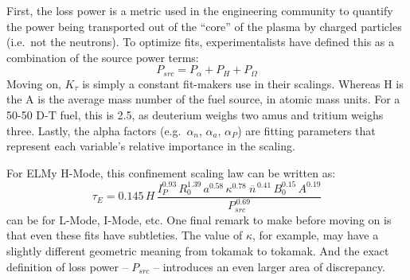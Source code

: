 First, the loss power is a metric used in the engineering community to quantify the power being transported out of the ``core'' of the plasma by charged particles (i.e.\ not the neutrons). \cite{process} To optimize fits, experimentalists have defined this as a combination of the source power terms:
\begin{equation}
	\label{eq:pl}
	P_{src} = P_\alpha + P_H + P_\Omega
\end{equation}
Moving on, $K_\tau$ is simply a constant fit-makers use in their scalings. Whereas H is the   A is the average mass number of the fuel source, in atomic mass units. For a 50-50 D-T fuel, this is 2.5, as deuterium weighs two amus and tritium weighs three. Lastly, the alpha factors (e.g.\ $\alpha_n$, $\alpha_a$, $\alpha_P$) are fitting parameters that represent each variable's relative importance in the scaling. 

For ELMy H-Mode, this confinement scaling law can be written as:
\begin{equation}
	\tau_E = 0.145 \, H \, \frac{
		I_P^{0.93} \, R_0^{1.39} \, a^{0.58} \, \kappa^{0.78} \ \overline{n}^{\, 0.41} \, B_0^{0.15} \, A^{0.19}
	}{ P_{src} ^ {\,0.69} }
	\label{eq:tau_h}
\end{equation}
 can be  for L-Mode, I-Mode, etc. One final remark to make before moving on is that even these fits have subtleties. The value of $\kappa$, for example, may have a slightly different geometric meaning from tokamak to tokamak. And the exact definition of loss power -- $P_{src}$ -- introduces an even larger area of discrepancy.  

